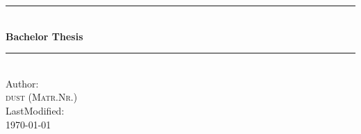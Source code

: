 
\newcommand{\TitleHRule}{\rule{\linewidth}{0.5mm}}

\begin{titlepage}
    \begin{center}

        \TitleHRule\\[0.4cm]
        {
            \huge \bfseries
            Bachelor Thesis\\[0.4cm]
        }
        \TitleHRule\\[0.4cm]
        \vfill
        Author:\\
        \textsc{dust (Matr.Nr.)}\\[1cm]
        LastModified:\\
        \today
    \end{center}
\end{titlepage}
